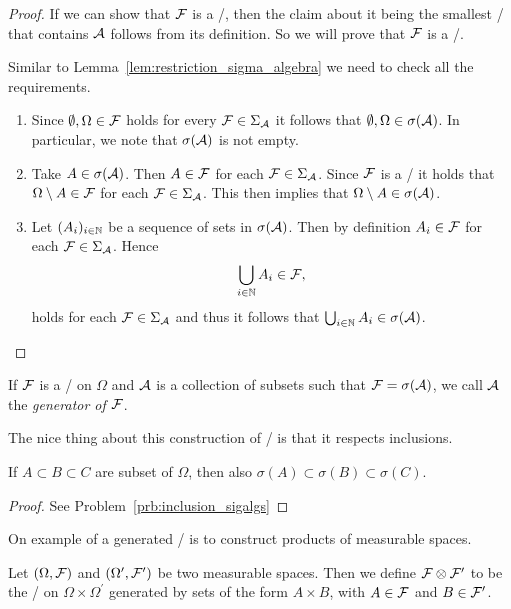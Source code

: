 \begin{proof}
If we can show that $\mathcal F$ is a \sigalg/, then the claim about it being the smallest \sigalg/ that contains $\mathcal A$ follows from its definition. So we will prove that $\mathcal F$ is a \sigalg/.

Similar to Lemma~\ref{lem:restriction_sigma_algebra} we need to check all the requirements.
\begin{enumerate}
\item Since $\emptyset, \Omega \in \mathcal F$ holds for every $\mathcal F \in \Sigma_{\mathcal A}$ it follows that $\emptyset, \Omega \in \sigma(\mathcal A)$. In particular, we note that $\sigma(\mathcal A)$ is not empty.
\item Take $A \in \sigma(\mathcal A)$. Then $A \in \mathcal F$ for each $\mathcal F \in \Sigma_{\mathcal A}$. Since $\mathcal F$ is a \sigalg/ it holds that $\Omega \setminus A \in \mathcal F$ for each $\mathcal F \in \Sigma_{\mathcal A}$. This then implies that $\Omega \setminus A \in \sigma(\mathcal A)$.
\item Let $(A_i)_{i \in \mathbb N}$ be a sequence of sets in $\sigma(\mathcal A)$. Then by definition $A_i \in \mathcal F$ for each $\mathcal F \in \Sigma_{\mathcal A}$. Hence
\[
	\bigcup_{i \in \mathbb N} A_i \in \mathcal F,
\] 
holds for each $\mathcal F \in \Sigma_{\mathcal A}$ and thus it follows that $\bigcup_{i \in \mathbb N} A_i \in \sigma(\mathcal A)$.
\end{enumerate}
\end{proof}

If $\mathcal F$ is a \sigalg/ on $\Omega$ and $\mathcal A$ is a collection of subsets such that $\mathcal F = \sigma(\mathcal A)$, we call $\mathcal A$ the \emph{generator of $\mathcal F$}. 

The nice thing about this construction of \sigalgs/ is that it respects inclusions.

\begin{lemma}\label{lem:inclusion_sigalgs}
If $A \subset B \subset C$ are subset of $\Omega$, then also $\sigma(A) \subset \sigma(B) \subset \sigma(C)$.
\end{lemma}

\begin{proof}
See Problem~\ref{prb:inclusion_sigalgs}
\end{proof}

On example of a generated \sigalg/ is to construct products of measurable spaces.

\begin{definition}\label{def:product_sigalg}
Let $(\Omega, \mathcal F)$ and $(\Omega^\prime, \mathcal F^\prime)$ be two measurable spaces. Then we define $\mathcal F \otimes \mathcal F^\prime$ to be the \sigalg/ on $\Omega \times \Omega^\prime$ generated by sets of the form $A \times B$, with $A \in \mathcal F$ and $B \in \mathcal F^\prime$.
\end{definition}

